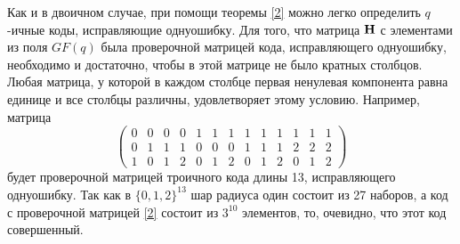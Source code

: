 \documentclass[12pt]{article}
\begin{document}
    Как и в двоичном случае, при помощи теоремы \eqref{2} можно легко определить 
    $q$-ичные коды, исправляющие однуошибку. Для того, что матрица ${\bf H}$
    с элементами из поля $GF(q)$ была проверочной матрицей кода, исправляющего
    однуошибку, необходимо и достаточно, чтобы в этой матрице не было
    кратных столбцов. Любая матрица, у которой в каждом столбце первая
    ненулевая компонента равна единице и все столбцы различны, удовлетворяет 
    этому условию. Например, матрица
    \begin{equation}
    \begin{pmatrix} 
        0&0&0&0&1&1&1&1&1&1&1&1&1\\ 
        0&1&1&1&0&0&0&1&1&1&2&2&2\\ 
        1&0&1&2&0&1&2&0&1&2&0&1&2
    \end{pmatrix}
    \label{2}
    \end{equation}
    будет проверочной матрицей троичного кода длины 13, исправляющего  однуошибку. Так как в $\{0, 1, 2\}^{13}$ шар радиуса один состоит из 27 наборов, а код с проверочной матрицей \eqref{2} состоит из $3^{10}$ элементов, то, очевидно, что этот код совершенный.
\end{document}
